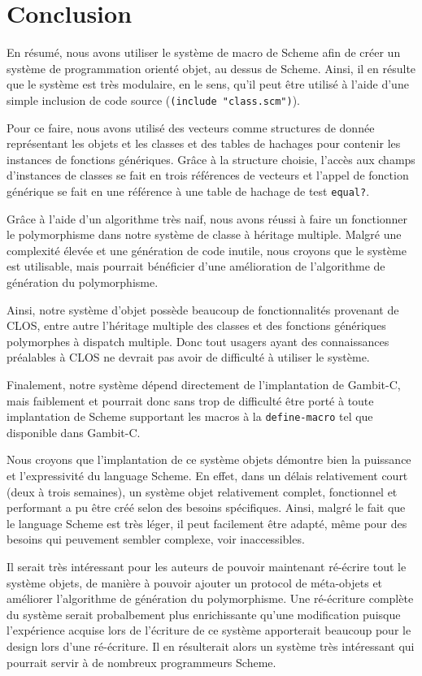 \clearpage

\section{Conclusion}
  En résumé, nous avons utiliser le système de macro de Scheme afin de
  créer un système de programmation orienté objet, au dessus de
  Scheme. Ainsi, il en résulte que le système est très modulaire, en
  le sens, qu'il peut être utilisé à l'aide d'une simple inclusion de
  code source (\texttt{(include "class.scm")}). 

  Pour ce faire, nous avons utilisé des vecteurs comme structures de
  donnée représentant les objets et les classes et des tables de
  hachages pour contenir les instances de fonctions génériques. Grâce
  à la structure choisie, l'accès aux champs d'instances de classes se
  fait en trois références de vecteurs et l'appel de fonction
  générique se fait en une référence à une table de hachage de test
  \texttt{equal?}.

  Grâce à l'aide d'un algorithme très naif, nous avons réussi à faire
  un fonctionner le polymorphisme dans notre système de classe à
  héritage multiple. Malgré une complexité élevée et une génération de
  code inutile, nous croyons que le système est utilisable, mais
  pourrait bénéficier d'une amélioration de l'algorithme de génération
  du polymorphisme.

  Ainsi, notre système d'objet possède beaucoup de fonctionnalités
  provenant de CLOS, entre autre l'héritage multiple des classes et
  des fonctions génériques polymorphes à \og dispatch \fg
  multiple. Donc tout usagers ayant des connaissances préalables à
  CLOS ne devrait pas avoir de difficulté à utiliser le système.

  Finalement, notre système dépend directement de l'implantation de
  Gambit-C, mais faiblement et pourrait donc sans trop de difficulté
  être porté à toute implantation de Scheme supportant les macros à la
  \texttt{define-macro} tel que disponible dans Gambit-C.

  Nous croyons que l'implantation de ce système objets démontre bien
  la puissance et l'expressivité du language Scheme. En effet, dans un
  délais relativement court (deux à trois semaines), un système objet
  relativement complet, fonctionnel et performant a pu être créé selon
  des besoins spécifiques. Ainsi, malgré le fait que le language
  Scheme est très léger, il peut facilement être adapté, même pour des
  besoins qui peuvement sembler complexe, voir inaccessibles.

  Il serait très intéressant pour les auteurs de pouvoir maintenant
  ré-écrire tout le système objets, de manière à pouvoir ajouter un
  protocol de méta-objets et améliorer l'algorithme de génération du
  polymorphisme. Une ré-écriture complète du système serait
  probalbement plus enrichissante qu'une modification puisque
  l'expérience acquise lors de l'écriture de ce système apporterait
  beaucoup pour le design lors d'une ré-écriture. Il en résulterait
  alors un système très intéressant qui pourrait servir à de nombreux
  programmeurs Scheme.

